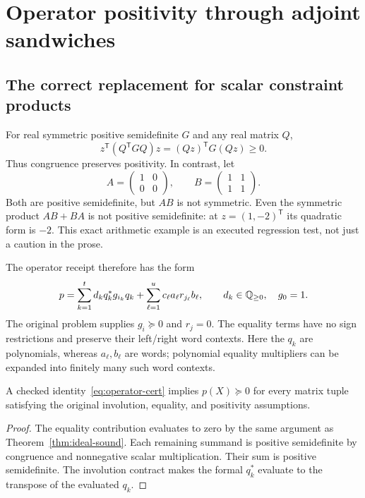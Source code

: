 \section{Operator positivity through adjoint sandwiches}
\label{sec:operator}

\subsection{The correct replacement for scalar constraint products}

For real symmetric positive semidefinite $G$ and any real matrix $Q$,
\[
 z^{\mathsf T}(Q^{\mathsf T}GQ)z=(Qz)^{\mathsf T}G(Qz)\ge0.
\]
Thus congruence preserves positivity. In contrast, let
\[
 A=\begin{pmatrix}1&0\\0&0\end{pmatrix},\qquad
 B=\begin{pmatrix}1&1\\1&1\end{pmatrix}.
\]
Both are positive semidefinite, but $AB$ is not symmetric. Even the symmetric
product $AB+BA$ is not positive semidefinite: at $z=(1,-2)^{\mathsf T}$ its
quadratic form is $-2$. This exact arithmetic example is an executed regression
test, not just a caution in the prose.

The operator receipt therefore has the form
\begin{equation}\label{eq:operator-cert}
 p=\sum_{k=1}^{t} d_k q_k^*g_{i_k}q_k
    +\sum_{\ell=1}^{u}c_\ell a_\ell r_{j_\ell}b_\ell,
 \qquad d_k\in\mathbb Q_{\ge0},\quad g_0=1.
\end{equation}
The original problem supplies $g_i\succeq0$ and $r_j=0$. The equality terms have
no sign restrictions and preserve their left/right word contexts. Here the
$q_k$ are polynomials, whereas $a_\ell,b_\ell$ are words; polynomial equality
multipliers can be expanded into finitely many such word contexts.

\begin{theorem}\label{thm:operator}
A checked identity~\eqref{eq:operator-cert} implies $p(X)\succeq0$ for every
matrix tuple satisfying the original involution, equality, and positivity
assumptions.
\end{theorem}
\begin{proof}
The equality contribution evaluates to zero by the same argument as
Theorem~\ref{thm:ideal-sound}. Each remaining summand is positive semidefinite
by congruence and nonnegative scalar multiplication. Their sum is positive
semidefinite. The involution contract makes the formal $q_k^*$ evaluate to the
transpose of the evaluated $q_k$.
\end{proof}

